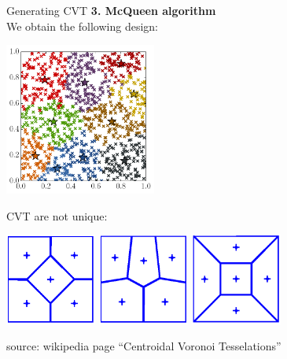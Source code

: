 \documentclass{beamer}
\begin{document}
\begin{frame}{Generating CVT }
\textbf{3. McQueen algorithm}\\
We obtain the following design:
\begin{center}
\includegraphics[height=5cm]{figures/python/spf_McQueen}
\end{center}
\end{frame}

\begin{frame}{}
CVT are not unique:
\begin{center}
\includegraphics[height=3cm]{figures/CVT1} \qquad
\includegraphics[height=3cm]{figures/CVT2} \qquad
\includegraphics[height=3cm]{figures/CVT3}
\end{center}
 source: wikipedia page ``Centroidal Voronoi Tesselations''
\end{frame}

\end{document}
